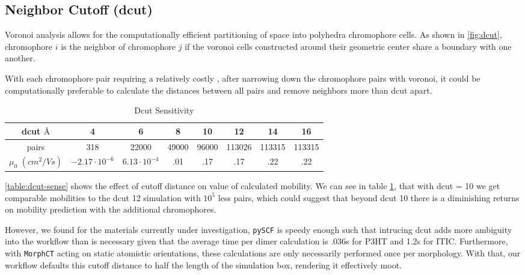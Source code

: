 \subsection{Neighbor Cutoff (dcut)}
\label{dcutresults}
Voronoi analysis allows for the computationally efficient partitioning of space into
polyhedra chromophore cells. As shown in \ref{fig:dcut}, chromophore $i$ is the neighbor of chromophore $j$
if the voronoi cells constructed around their geometric center
share a boundary with one another. 

With each chromophore pair requiring a relatively costly , after narrowing down the chromophore pairs with voronoi, it
could be
computationally preferable to calculate the distances between all pairs and remove neighbors more than dcut
apart.

\begin{table}
\caption{Dcut Sensitivity}
\centering %
\begin{tabular}{c c c c c c c c} %
\hline\hline %
    dcut $\text{\AA}$ & 4 & 6 & 8 & 10 & 12 & 14 & 16 \\ [0.5ex] %
\hline  %
pairs & 318 & 22000 & 49000 & 96000 & 113026 & 113315 & 113315 \\ [1ex]%
$\mu_{0}$ $(cm^{2}/Vs)$ & $-2.17 \cdot 10^{-6}$ & $6.13 \cdot 10^{-4}$ & .01 & .17 & .17 & .22 & .22 \\ [1ex] %
\hline %
\end{tabular}
\label{table:dcut-sense} %
\end{table}

\autoref{table:dcut-sense} shows the effect of cutoff distance on value of
calculated mobility.  
 We can see in table \ref{table:dcut-sense}, that with dcut = 10 we get comparable mobilities to the
dcut 12 simulation with $10^5$ less
pairs, which could suggest that beyond dcut 10 there is a diminishing returns on mobility prediction with the
additional chromophores. 

However, we found for the materials currently under investigation,
\texttt{pySCF} is speedy enough such that intrucing dcut adds more ambiguity
into the workflow than is necessary given that the average time per  dimer calculation is .036s for P3HT and
1.2s for ITIC. Furthermore, with \texttt{MorphCT} acting on static atomistic orientations, these calculations 
are only necessarily performed once per morphology. With that, our workflow defaults this cutoff distance to half
the length of the simulation box, rendering it effectively moot. 


